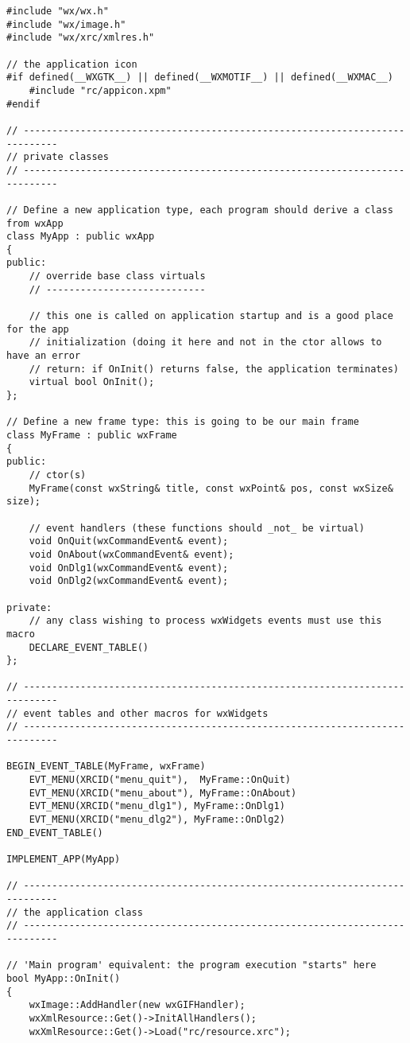 \begin{verbatim}
#include "wx/wx.h"
#include "wx/image.h"
#include "wx/xrc/xmlres.h"

// the application icon
#if defined(__WXGTK__) || defined(__WXMOTIF__) || defined(__WXMAC__)
    #include "rc/appicon.xpm"
#endif

// ----------------------------------------------------------------------------
// private classes
// ----------------------------------------------------------------------------

// Define a new application type, each program should derive a class from wxApp
class MyApp : public wxApp
{
public:
    // override base class virtuals
    // ----------------------------

    // this one is called on application startup and is a good place for the app
    // initialization (doing it here and not in the ctor allows to have an error
    // return: if OnInit() returns false, the application terminates)
    virtual bool OnInit();
};

// Define a new frame type: this is going to be our main frame
class MyFrame : public wxFrame
{
public:
    // ctor(s)
    MyFrame(const wxString& title, const wxPoint& pos, const wxSize& size);

    // event handlers (these functions should _not_ be virtual)
    void OnQuit(wxCommandEvent& event);
    void OnAbout(wxCommandEvent& event);
    void OnDlg1(wxCommandEvent& event);
    void OnDlg2(wxCommandEvent& event);

private:
    // any class wishing to process wxWidgets events must use this macro
    DECLARE_EVENT_TABLE()
};

// ----------------------------------------------------------------------------
// event tables and other macros for wxWidgets
// ----------------------------------------------------------------------------

BEGIN_EVENT_TABLE(MyFrame, wxFrame)
    EVT_MENU(XRCID("menu_quit"),  MyFrame::OnQuit)
    EVT_MENU(XRCID("menu_about"), MyFrame::OnAbout)
    EVT_MENU(XRCID("menu_dlg1"), MyFrame::OnDlg1)
    EVT_MENU(XRCID("menu_dlg2"), MyFrame::OnDlg2)
END_EVENT_TABLE()

IMPLEMENT_APP(MyApp)

// ----------------------------------------------------------------------------
// the application class
// ----------------------------------------------------------------------------

// 'Main program' equivalent: the program execution "starts" here
bool MyApp::OnInit()
{
    wxImage::AddHandler(new wxGIFHandler);
    wxXmlResource::Get()->InitAllHandlers();
    wxXmlResource::Get()->Load("rc/resource.xrc");


\end{verbatim}
